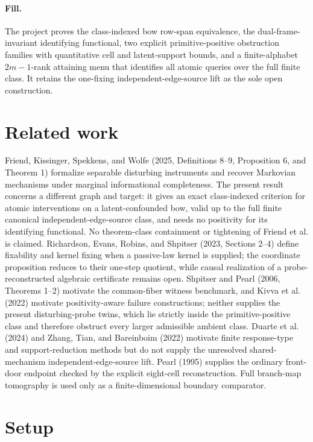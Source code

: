 \documentclass{article}
\begin{document}
\paragraph{Fill.} The project proves the class-indexed bow row-span equivalence, the dual-frame-invariant identifying functional, two explicit primitive-positive obstruction families with quantitative cell and latent-support bounds, and a finite-alphabet \(2m-1\)-rank attaining menu that identifies all atomic queries over the full finite class. It retains the one-fixing independent-edge-source lift as the sole open construction.

\section{Related work}

Friend, Kissinger, Spekkens, and Wolfe (2025, Definitions 8--9, Proposition 6, and Theorem 1) formalize separable disturbing instruments and recover Markovian mechanisms under marginal informational completeness. The present result concerns a different graph and target: it gives an exact class-indexed criterion for atomic interventions on a latent-confounded bow, valid up to the full finite canonical independent-edge-source class, and needs no positivity for its identifying functional. No theorem-class containment or tightening of Friend et al. is claimed. Richardson, Evans, Robins, and Shpitser (2023, Sections 2--4) define fixability and kernel fixing when a passive-law kernel is supplied; the coordinate proposition reduces to their one-step quotient, while causal realization of a probe-reconstructed algebraic certificate remains open. Shpitser and Pearl (2006, Theorems 1--2) motivate the common-fiber witness benchmark, and Kivva et al. (2022) motivate positivity-aware failure constructions; neither supplies the present disturbing-probe twins, which lie strictly inside the primitive-positive class and therefore obstruct every larger admissible ambient class. Duarte et al. (2024) and Zhang, Tian, and Bareinboim (2022) motivate finite response-type and support-reduction methods but do not supply the unresolved shared-mechanism independent-edge-source lift. Pearl (1995) supplies the ordinary front-door endpoint checked by the explicit eight-cell reconstruction. Full branch-map tomography is used only as a finite-dimensional boundary comparator.

\section{Setup}
\end{document}
